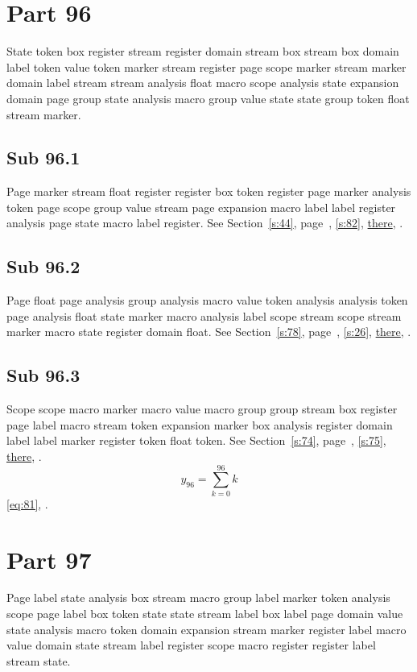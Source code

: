 \documentclass[11pt]{article}
\begin{document}
\section{Part 96}\label{s:96}
State token box register stream register domain stream box stream box domain label token value token marker stream register page scope marker stream marker domain label stream stream analysis float macro scope analysis state expansion domain page group state analysis macro group value state state group token float stream marker.
\subsection{Sub 96.1}\label{ss:96.1} Page marker stream float register register box token register page marker analysis token page scope group value stream page expansion macro label label register analysis page state macro label register. See Section~\ref{s:44}, page~\pageref{ss:100.1}, \cref{s:82}, \hyperref[s:15]{there}, \cite{k36,k107}.
\subsection{Sub 96.2}\label{ss:96.2} Page float page analysis group analysis macro value token analysis analysis token page analysis float state marker macro analysis label scope stream scope stream marker macro state register domain float. See Section~\ref{s:78}, page~\pageref{ss:49.1}, \cref{s:26}, \hyperref[s:68]{there}, \cite{k98,k55}.
\subsection{Sub 96.3}\label{ss:96.3} Scope scope macro marker macro value macro group group stream box register page label macro stream token expansion marker box analysis register domain label label marker register token float token. See Section~\ref{s:74}, page~\pageref{ss:75.2}, \cref{s:75}, \hyperref[s:77]{there}, \cite{k78,k108}.
\begin{equation}y_{96}=\sum_{k=0}^{96}k\label{eq:96}\end{equation} \eqref{eq:81}, .
\section{Part 97}\label{s:97}
Page label state analysis box stream macro group label marker token analysis scope page label box token state state stream label box label page domain value state analysis macro token domain expansion stream marker register label macro value domain state stream label register scope macro register register label stream state.
\end{document}
